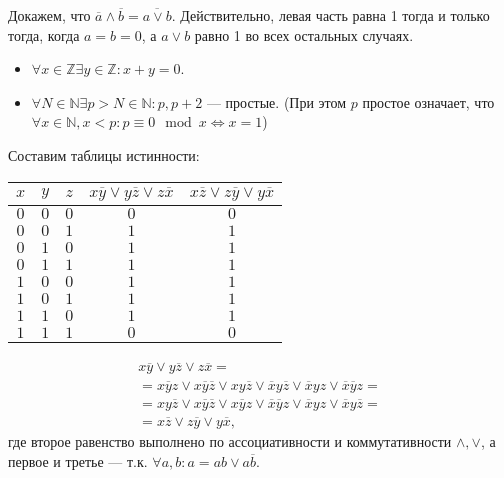 \documentclass[12pt,a4paper]{article}
\begin{document}


\z Докажем, что $\overline{a}\land \overline{b}=\overline{a\lor b}$. Действительно, левая часть равна 1 тогда и только тогда, когда $a=b=0$, а $a\lor b$ равно 1 во всех остальных случаях.\QEDA\\

\z

\begin{itemize}
	\item $\forall x\in \mathbb Z\exists y\in \mathbb Z:x+y=0$.
	\item $\forall N\in \mathbb N\exists p>N\in \mathbb N:p,p+2$ --- простые. (При этом $p$ простое означает, что $\forall x\in \mathbb N,x<p:p\equiv 0\mod x\iff x=1$)\QEDA\\
\end{itemize}

\n Составим таблицы истинности:

\begin{tabular}{|c|c|c|c|c|}
	\hline
	$x$ & $y$ & $z$ & $x\overline{y}\lor y\overline{z}\lor z\overline{x}$ & $x\overline{z}\lor z\overline{y}\lor y\overline{x}$\\
	\hline
	$0$ & $0$ & $0$ & $0$ & $0$\\
	\hline
	$0$ & $0$ & $1$ & $1$ & $1$\\
	\hline
	$0$ & $1$ & $0$ & $1$ & $1$\\
	\hline
	$0$ & $1$ & $1$ & $1$ & $1$\\
	\hline
	$1$ & $0$ & $0$ & $1$ & $1$\\
	\hline
	$1$ & $0$ & $1$ & $1$ & $1$\\
	\hline
	$1$ & $1$ & $0$ & $1$ & $1$\\
	\hline
	$1$ & $1$ & $1$ & $0$ & $0$\\
	\hline
\end{tabular}

\p
{\Large \begin{align*}
		x\overline{y}\lor y\overline{z}\lor z\overline{x}=\\
		= x\overline{y}z\lor x\overline{y}\overline{z}\lor xy\overline{z}\lor \overline{x}y\overline{z}\lor \overline{x}yz\lor \overline{x}\overline{y}z=\\
		= xy\overline{z}\lor x\overline{y}\overline{z}\lor x\overline{y}z\lor \overline{x}\overline{y}z\lor \overline{x}yz\lor \overline{x}y\overline{z}=\\
		=x\overline{z}\lor z\overline{y}\lor y\overline{x},
\end{align*}}
где второе равенство выполнено по ассоциативности и коммутативности $\land,\lor$, а первое и третье --- т.к. $\forall a,b:a=ab\lor a\overline{b}$.\QEDA\\
\end{document}
